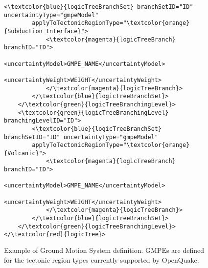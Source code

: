 \begin{figure}[htbp]
\begin{center}
\begin{Verbatim}[frame=single, commandchars=\\\{\},fontsize=\scriptsize, samepage=true]
		<\textcolor{blue}{logicTreeBranchSet} branchSetID="ID" uncertaintyType="gmpeModel" 
		applyToTectonicRegionType="\textcolor{orange}{Subduction Interface}">
			<\textcolor{magenta}{logicTreeBranch} branchID="ID">
				<uncertaintyModel>GMPE_NAME</uncertaintyModel>
				<uncertaintyWeight>WEIGHT</uncertaintyWeight>
			</\textcolor{magenta}{logicTreeBranch}>                
		</\textcolor{blue}{logicTreeBranchSet}>
	</\textcolor{green}{logicTreeBranchingLevel}>
	<\textcolor{green}{logicTreeBranchingLevel} branchingLevelID="ID">
		<\textcolor{blue}{logicTreeBranchSet} branchSetID="ID" uncertaintyType="gmpeModel" 
		applyToTectonicRegionType="\textcolor{orange}{Volcanic}">
			<\textcolor{magenta}{logicTreeBranch} branchID="ID">
				<uncertaintyModel>GMPE_NAME</uncertaintyModel>
				<uncertaintyWeight>WEIGHT</uncertaintyWeight>
			</\textcolor{magenta}{logicTreeBranch}>                
		</\textcolor{blue}{logicTreeBranchSet}>
	</\textcolor{green}{logicTreeBranchingLevel}>           
</\textcolor{red}{logicTree}>
\end{Verbatim}
\caption{Example of Ground Motion System definition. GMPEs are defined for the tectonic region types currently supported by OpenQuake.}
\label{lt2}
\end{center}
\end{figure}


